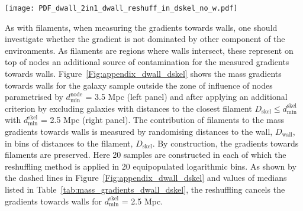 \documentclass[useAMS,usenatbib]{mnras}
\begin{document}
\begin{figure*}
\texttt{[image: PDF\_dwall\_2in1\_dwall\_reshuff\_in\_dskel\_no\_w.pdf]}
\caption{\textit{Top row:} Differential distributions of the normalised distances to the nearest wall, $D_{\mathrm{wall}}$. 
The solid lines show mass gradients after removing galaxies with distances to the node smaller than 3.5 Mpc (left) and after applying an additional criteria on the distance to the filament, such that galaxies with distances to the filament smaller than 2.5 Mpc (right) are removed. The dashed lines illustrate mass gradient after reshuffling of $D_{\mathrm{skel}}$ of galaxies in bins of distances to the node $D_{\mathrm{node}}$. As shown on the right panel, these are almost completely cancelled after removing sufficiently large regions around nodes and filaments.
The vertical lines indicate the medians of the distributions and their values together with associated errors are listed in Table~\ref{tab:mass_gradients_dwall_dskel}. 
\textit{Bottom row:} Residuals in units of $\sigma$ as in Figure~\ref{Fig:appendix_dskel_dnode}.}
\label{Fig:appendix_dwall_dskel}
\end{figure*}

As with filaments, when measuring the gradients towards walls, one should investigate whether the gradient is not dominated by other component of the  environments. As filaments are regions where walls intersect,  these represent  on top of nodes 
an additional source of contamination for the measured gradients  towards walls.
Figure~\ref{Fig:appendix_dwall_dskel} shows the mass gradients towards walls for the galaxy sample outside the zone of influence of nodes parametrised by $d^{\mathrm{node}}_{\mathrm{min}}$ = 3.5 Mpc (left panel) and after applying an additional criterion by excluding galaxies with distances to the closest filament 
$D_{\mathrm{skel}} \leq d^{\mathrm{skel}}_{\mathrm{min}}$ with $d^{\mathrm{skel}}_{\mathrm{min}}$ = 2.5 Mpc (right panel). 
The contribution of filaments to the mass gradients towards walls is measured by randomising distances to the wall, $D_{\mathrm{wall}}$, in bins of distances to the filament, $D_{\mathrm{skel}}$. By construction, the gradients towards filaments are preserved. 
Here 20 samples are constructed in each of which the reshuffling method is applied in 20 equipopulated logarithmic bins.  
As shown by the dashed lines in Figure~\ref{Fig:appendix_dwall_dskel} and values of medians listed in Table~\ref{tab:mass_gradients_dwall_dskel}, the reshuffling cancels the gradients towards walls for $d^{\mathrm{skel}}_{\mathrm{min}}$ = 2.5 Mpc.  
\end{document}

